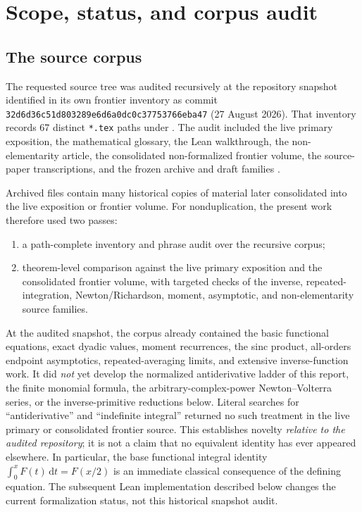 \documentclass[11pt,oneside]{article}
\theoremstyle{definition}
\theoremstyle{remark}
\newcommand{\dd}{\,\mathrm d}
\newcommand{\1}{\mathbf 1}
\begin{document}
\tableofcontents
\newpage

\section{Scope, status, and corpus audit}

\subsection{The source corpus}
The requested source tree was audited recursively at the repository snapshot
identified in its own frontier inventory as commit
\texttt{32d6d36c51d803289e6d6a0dc0c37753766eba47} (27 August 2026).  That
inventory records 67 distinct \texttt{*.tex} paths under
.  The audit included the live primary
exposition, the mathematical glossary, the Lean walkthrough, the
non-elementarity article, the consolidated non-formalized frontier volume,
the source-paper transcriptions, and the frozen archive and draft families
\cite{ProveItPrimary,ProveItFrontiers,ProveItGlossary,ProveItLean,
ProveItNonElementary,ProveItInventory}.

Archived files contain many historical copies of material later consolidated
into the live exposition or frontier volume.  For nonduplication, the present
work therefore used two passes:
\begin{enumerate}
\item a path-complete inventory and phrase audit over the recursive corpus;
\item theorem-level comparison against the live primary exposition and the
      consolidated frontier volume, with targeted checks of the inverse,
      repeated-integration, Newton/Richardson, moment, asymptotic, and
      non-elementarity source families.
\end{enumerate}
At the audited snapshot, the corpus already contained the basic functional
equations, exact dyadic values, moment recurrences, the sinc product,
all-orders endpoint asymptotics, repeated-averaging limits, and extensive
inverse-function work.  It did \emph{not} yet develop the normalized
antiderivative ladder of this report, the finite monomial formula, the
arbitrary-complex-power Newton--Volterra series, or the inverse-primitive
reductions below.  Literal searches for
``antiderivative'' and ``indefinite integral'' returned no such treatment in
the live primary or consolidated frontier source.  This establishes novelty
\emph{relative to the audited repository}; it is not a claim that no equivalent
identity has ever appeared elsewhere.  In particular, the base functional
integral identity \(\int_0^xF(t)\dd t=F(x/2)\) is an immediate classical
consequence of the defining equation.  The subsequent Lean implementation
described below changes the current formalization status, not this historical
snapshot audit.
\end{document}
